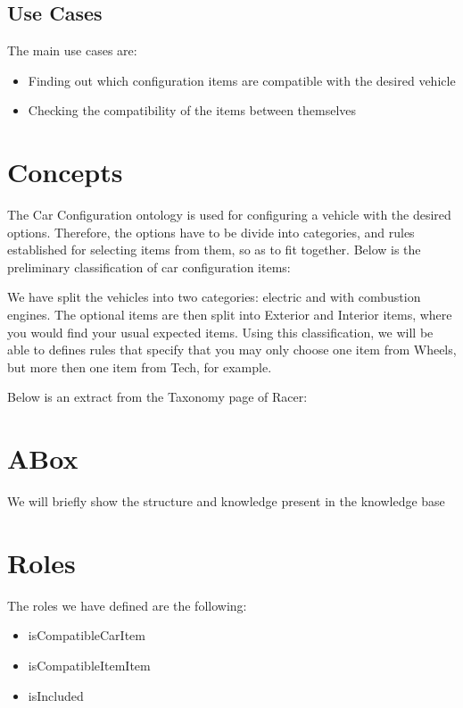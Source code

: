 \documentclass[a4paper,12pt]{report}
\begin{document}
\section{Use Cases}
The main use cases are:
\begin{itemize}
  \item Finding out which configuration items are compatible with the desired vehicle
  \item Checking the compatibility of the items between themselves
  \end{itemize}

\chapter{Concepts}
The Car Configuration ontology is used for configuring a vehicle with the desired options.
Therefore, the options have to be divide into categories, and rules established for selecting items from them, so as to fit together.
Below is the preliminary classification of car configuration items:

\begin{center}
\end{center}

We have split the vehicles into two categories: electric and with combustion engines. The optional items are then split into Exterior and Interior items, where you would find your usual expected items.
Using this classification, we will be able to defines rules that specify that you may only choose one item from Wheels, but more then one item from Tech, for example.

Below is an extract from the Taxonomy page of Racer:

\begin{center}
\end{center}

\chapter{ABox}
We will briefly show the structure and knowledge present in the knowledge base

\chapter{Roles}
The roles we have defined are the following:
\begin{itemize}
    \item isCompatibleCarItem
    \item isCompatibleItemItem
    \item isIncluded
    
\end{itemize}
\end{document}
